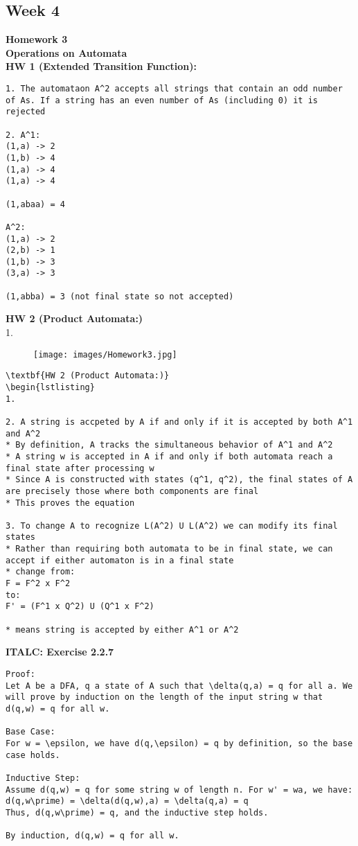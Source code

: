 \documentclass{article}
\theoremstyle{theorem}
\theoremstyle{definition}
\theoremstyle{remark}
\begin{document}
\subsection{Week 4}
\textbf{Homework 3} \\
\textbf{Operations on Automata} \\
\textbf{HW 1 (Extended Transition Function):} 
\begin{lstlisting}
1. The automataon A^2 accepts all strings that contain an odd number of As. If a string has an even number of As (including 0) it is rejected

2. A^1: 
(1,a) -> 2
(1,b) -> 4
(1,a) -> 4
(1,a) -> 4

(1,abaa) = 4

A^2: 
(1,a) -> 2
(2,b) -> 1
(1,b) -> 3
(3,a) -> 3

(1,abba) = 3 (not final state so not accepted)
\end{lstlisting}

\textbf{HW 2 (Product Automata:)}\\
1. \begin{figure}[htbp]
    \centering
    \texttt{[image: images/Homework3.jpg]} %
    \caption{}
\end{figure}
\begin{lstlisting}
\textbf{HW 2 (Product Automata:)}
\begin{lstlisting}
1. 

2. A string is accpeted by A if and only if it is accepted by both A^1 and A^2
* By definition, A tracks the simultaneous behavior of A^1 and A^2
* A string w is accepted in A if and only if both automata reach a final state after processing w
* Since A is constructed with states (q^1, q^2), the final states of A are precisely those where both components are final
* This proves the equation

3. To change A to recognize L(A^2) U L(A^2) we can modify its final states
* Rather than requiring both automata to be in final state, we can accept if either automaton is in a final state
* change from:
F = F^2 x F^2
to:
F' = (F^1 x Q^2) U (Q^1 x F^2)

* means string is accepted by either A^1 or A^2
\end{lstlisting}

\textbf{ITALC: Exercise 2.2.7}
\begin{lstlisting}
Proof:
Let A be a DFA, q a state of A such that \delta(q,a) = q for all a. We will prove by induction on the length of the input string w that d(q,w) = q for all w.

Base Case: 
For w = \epsilon, we have d(q,\epsilon) = q by definition, so the base case holds.

Inductive Step:
Assume d(q,w) = q for some string w of length n. For w' = wa, we have:
d(q,w\prime) = \delta(d(q,w),a) = \delta(q,a) = q
Thus, d(q,w\prime) = q, and the inductive step holds.

By induction, d(q,w) = q for all w.
\end{lstlisting}
\end{document}
